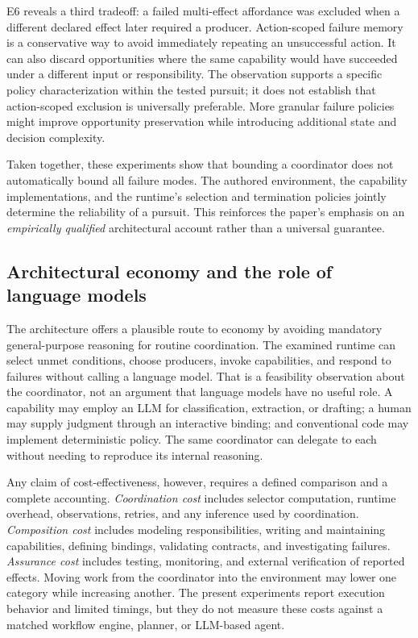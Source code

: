 \documentclass[11pt]{article}
\begin{document}
E6 reveals a third tradeoff: a failed multi-effect affordance was excluded when a different declared effect later required a producer. Action-scoped failure memory is a conservative way to avoid immediately repeating an unsuccessful action. It can also discard opportunities where the same capability would have succeeded under a different input or responsibility. The observation supports a specific policy characterization within the tested pursuit; it does not establish that action-scoped exclusion is universally preferable. More granular failure policies might improve opportunity preservation while introducing additional state and decision complexity.

Taken together, these experiments show that bounding a coordinator does not automatically bound all failure modes. The authored environment, the capability implementations, and the runtime's selection and termination policies jointly determine the reliability of a pursuit. This reinforces the paper's emphasis on an \emph{empirically qualified} architectural account rather than a universal guarantee.

\subsection{Architectural economy and the role of language models}
The architecture offers a plausible route to economy by avoiding mandatory general-purpose reasoning for routine coordination. The examined runtime can select unmet conditions, choose producers, invoke capabilities, and respond to failures without calling a language model. That is a feasibility observation about the coordinator, not an argument that language models have no useful role. A capability may employ an LLM for classification, extraction, or drafting; a human may supply judgment through an interactive binding; and conventional code may implement deterministic policy. The same coordinator can delegate to each without needing to reproduce its internal reasoning.

Any claim of cost-effectiveness, however, requires a defined comparison and a complete accounting. \emph{Coordination cost} includes selector computation, runtime overhead, observations, retries, and any inference used by coordination. \emph{Composition cost} includes modeling responsibilities, writing and maintaining capabilities, defining bindings, validating contracts, and investigating failures. \emph{Assurance cost} includes testing, monitoring, and external verification of reported effects. Moving work from the coordinator into the environment may lower one category while increasing another. The present experiments report execution behavior and limited timings, but they do not measure these costs against a matched workflow engine, planner, or LLM-based agent.
\end{document}
